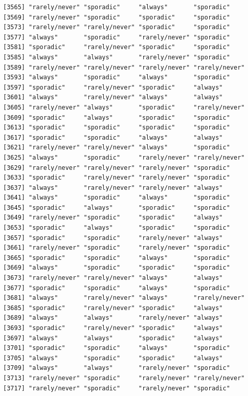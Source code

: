 \documentclass[
  letterpaper,
  DIV=11,
  numbers=noendperiod]{scrartcl}
\begin{document}
\begin{verbatim}
[3565] "rarely/never" "sporadic"     "always"       "sporadic"    
[3569] "rarely/never" "sporadic"     "sporadic"     "sporadic"    
[3573] "rarely/never" "rarely/never" "sporadic"     "sporadic"    
[3577] "always"       "sporadic"     "rarely/never" "sporadic"    
[3581] "sporadic"     "rarely/never" "sporadic"     "sporadic"    
[3585] "always"       "always"       "rarely/never" "sporadic"    
[3589] "rarely/never" "rarely/never" "rarely/never" "rarely/never"
[3593] "always"       "sporadic"     "always"       "sporadic"    
[3597] "sporadic"     "rarely/never" "sporadic"     "always"      
[3601] "always"       "rarely/never" "always"       "always"      
[3605] "rarely/never" "always"       "sporadic"     "rarely/never"
[3609] "sporadic"     "always"       "sporadic"     "sporadic"    
[3613] "sporadic"     "sporadic"     "sporadic"     "sporadic"    
[3617] "sporadic"     "sporadic"     "always"       "always"      
[3621] "rarely/never" "rarely/never" "always"       "sporadic"    
[3625] "always"       "sporadic"     "rarely/never" "rarely/never"
[3629] "rarely/never" "rarely/never" "rarely/never" "sporadic"    
[3633] "sporadic"     "rarely/never" "rarely/never" "sporadic"    
[3637] "always"       "rarely/never" "rarely/never" "always"      
[3641] "always"       "sporadic"     "always"       "sporadic"    
[3645] "sporadic"     "always"       "sporadic"     "sporadic"    
[3649] "rarely/never" "sporadic"     "sporadic"     "always"      
[3653] "sporadic"     "always"       "sporadic"     "sporadic"    
[3657] "sporadic"     "sporadic"     "rarely/never" "always"      
[3661] "rarely/never" "sporadic"     "rarely/never" "sporadic"    
[3665] "sporadic"     "sporadic"     "always"       "sporadic"    
[3669] "always"       "sporadic"     "sporadic"     "sporadic"    
[3673] "rarely/never" "rarely/never" "always"       "always"      
[3677] "sporadic"     "sporadic"     "always"       "sporadic"    
[3681] "always"       "rarely/never" "always"       "rarely/never"
[3685] "sporadic"     "rarely/never" "sporadic"     "always"      
[3689] "always"       "always"       "rarely/never" "always"      
[3693] "sporadic"     "rarely/never" "sporadic"     "always"      
[3697] "always"       "always"       "sporadic"     "always"      
[3701] "sporadic"     "sporadic"     "always"       "sporadic"    
[3705] "always"       "sporadic"     "sporadic"     "always"      
[3709] "always"       "always"       "rarely/never" "sporadic"    
[3713] "rarely/never" "sporadic"     "rarely/never" "rarely/never"
[3717] "rarely/never" "sporadic"     "rarely/never" "sporadic"    

\end{verbatim}
\end{document}
